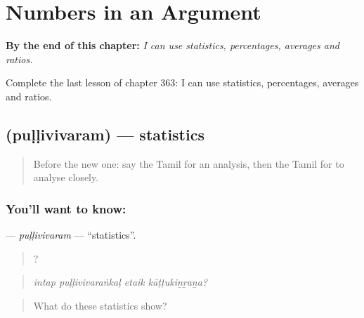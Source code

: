 
\chapter{Numbers in an Argument}
\label{ch:ta-numbers-in-an-argument}

\begin{chapteropening}
\textbf{By the end of this chapter:} \emph{I can use statistics, percentages, averages and ratios.}

Complete the last lesson of chapter 363: I can use statistics, percentages, averages and ratios.
\end{chapteropening}

\section[\texorpdfstring{\ta{புள்ளிவிவரம்} (puḷḷivivaram)}{புள்ளிவிவரம் (puḷḷivivaram)}]{ (puḷḷivivaram) — statistics}

\label{lesson:TA-C363-pullivivaram}



\begin{quote}
Before the new one: say the Tamil for an analysis, then the Tamil for to analyse closely.
\end{quote}

\subsection*{You'll want to know: }
\textbf{} — \emph{puḷḷivivaram} — \textquotedblleft{}statistics\textquotedblright{}.

\begin{quote}
   ?
\end{quote}

\begin{quote}
\emph{intap puḷḷivivaraṅkaḷ etaik kāṭṭukiṉṟaṉa?}
\end{quote}

\begin{quote}
What do these statistics show?
\end{quote}

